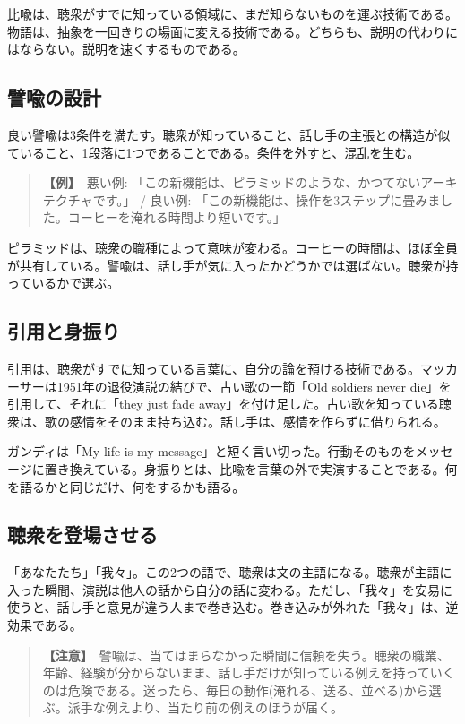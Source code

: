 \documentclass{article}
\begin{document}
比喩は、聴衆がすでに知っている領域に、まだ知らないものを運ぶ技術である。物語は、抽象を一回きりの場面に変える技術である。どちらも、説明の代わりにはならない。説明を速くするものである。

\subsection{譬喩の設計}

良い譬喩は3条件を満たす。聴衆が知っていること、話し手の主張との構造が似ていること、1段落に1つであることである。条件を外すと、混乱を生む。

\begin{quote}
\textbf{【例】}\ 悪い例: 「この新機能は、ピラミッドのような、かつてないアーキテクチャです。」 / 良い例: 「この新機能は、操作を3ステップに畳みました。コーヒーを淹れる時間より短いです。」
\end{quote}

ピラミッドは、聴衆の職種によって意味が変わる。コーヒーの時間は、ほぼ全員が共有している。譬喩は、話し手が気に入ったかどうかでは選ばない。聴衆が持っているかで選ぶ。

\subsection{引用と身振り}

引用は、聴衆がすでに知っている言葉に、自分の論を預ける技術である。マッカーサーは1951年の退役演説の結びで、古い歌の一節「Old soldiers never die」を引用して、それに「they just fade away」を付け足した。古い歌を知っている聴衆は、歌の感情をそのまま持ち込む。話し手は、感情を作らずに借りられる。

ガンディは「My life is my message」と短く言い切った。行動そのものをメッセージに置き換えている。身振りとは、比喩を言葉の外で実演することである。何を語るかと同じだけ、何をするかも語る。

\subsection{聴衆を登場させる}

「あなたたち」「我々」。この2つの語で、聴衆は文の主語になる。聴衆が主語に入った瞬間、演説は他人の話から自分の話に変わる。ただし、「我々」を安易に使うと、話し手と意見が違う人まで巻き込む。巻き込みが外れた「我々」は、逆効果である。

\begin{quote}
\textbf{【注意】}\ 譬喩は、当てはまらなかった瞬間に信頼を失う。聴衆の職業、年齢、経験が分からないまま、話し手だけが知っている例えを持っていくのは危険である。迷ったら、毎日の動作(淹れる、送る、並べる)から選ぶ。派手な例えより、当たり前の例えのほうが届く。
\end{quote}
\end{document}
